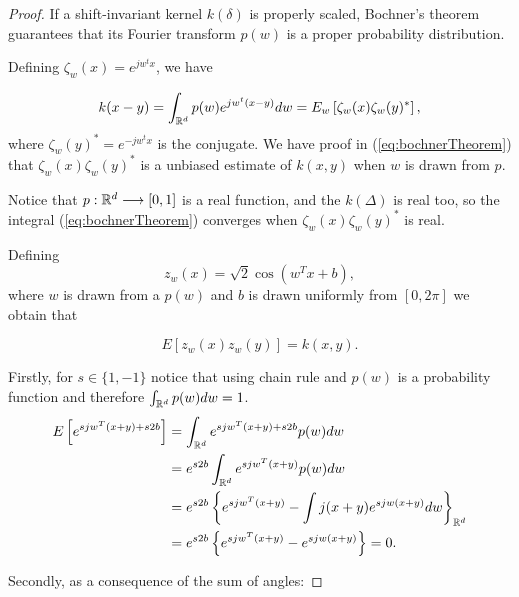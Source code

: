 \begin{proof}
If a shift-invariant kernel $k(\delta)$ is properly scaled, Bochner’s theorem guarantees that its Fourier transform 
$p(w)$
is a proper probability distribution.

Defining $\zeta_w(x) = e^{jw^tx}$, we have

\begin{equation}
    \label{eq:bochnerTheorem}
    k(x-y)
    =
    \int_{\mathbb{R}^d}
    p(w)
    e^{jw^t(x-y)}
    dw
    = 
    E_w\left[
        \zeta_w(x)
        \zeta_w(y)^*
    \right],
\end{equation}
where $\zeta_w(y)^* =  e^{- jw^tx}$ is the conjugate. 
We have proof in (\ref{eq:bochnerTheorem}) that $  \zeta_w(x)
\zeta_w(y)^*$ is a unbiased estimate of $k(x,y)$ when $w$ is drawn from $p$. 

Notice that $p: \mathbb{R}^d \longrightarrow [0,1]$ is a real function, 
and the $k(\Delta)$ is real too, so the integral (\ref{eq:bochnerTheorem})
converges when $\zeta_w(x)
\zeta_w(y)^*$ is real.

Defining 
\begin{equation}
    z_w(x) = \sqrt{2} \cos\left(w^T x + b\right), 
\end{equation}
where $w$ is drawn from a $p(w)$ and $b$ is drawn 
uniformly from $[0,2\pi]$ we obtain that 

\begin{equation} \label{unbiases_stimator}
    E \left[z_w(x) z_w(y) \right] = k(x,y). 
\end{equation}

Firstly, for $s \in \{1,-1\}$ notice that using chain rule and 
$p(w)$ is a probability function and therefore 
$\int_{\mathbb{R}^d} p(w) dw = 1$.
\begin{align}
    \label{eq:expected_value}
    E\left[ e^{sj w^T(x+y)+s2b}\right]
    & = 
    \int_{\mathbb{R}^d} e^{sj w^T(x+y)+s2b} p(w) dw
    \nonumber
    \\
    \nonumber
    & = 
    e^{s2b}\int_{\mathbb{R}^d} e^{sj w^T(x+y)} p(w) dw
    \\
    \nonumber
    & = 
    e^{s2b}\left\{ 
        e^{sj w^T(x+y)} 
        - 
        \int j(x+y) e^{sj w (x + y)} dw
    \right\}_{\mathbb{R}^d}
    \\
    & = 
    e^{s2b}\left\{ 
        e^{sj w^T(x+y)} 
        - 
         e^{sj w (x + y)} 
    \right\}
    = 0.
\end{align}

Secondly, as a consequence of the sum of angles: 


\end{proof}
